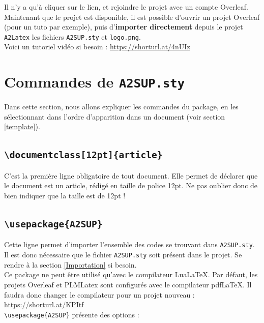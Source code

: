 \documentclass[a4paper,11pt]{article}
\begin{document}
Il n'y a qu'à cliquer sur le lien, et rejoindre le projet avec un compte Overleaf.\\

Maintenant que le projet est disponible, il est possible d'ouvrir un projet Overleaf (pour un tuto par exemple), puis d'\textbf{importer directement} depuis le projet \texttt{A2Latex} les fichiers \texttt{A2SUP.sty} et \texttt{logo.png}.\\

Voici un tutoriel vidéo si besoin : \url{https://shorturl.at/4nUIz}


\section{Commandes de \texttt{A2SUP.sty}}

Dans cette section, nous allons expliquer les commandes du package, en les sélectionnant dans l'ordre d'apparition dans un document (voir section \ref{template}).

\subsection{\texttt{\textbackslash documentclass[12pt]\{article\}}}

C'est la première ligne obligatoire de tout document. Elle permet de déclarer que le document est un article, rédigé en taille de police 12pt. Ne pas oublier donc de bien indiquer que la taille est de 12pt !

\subsection{\texttt{\textbackslash usepackage\{A2SUP\}}}

Cette ligne permet d'importer l'ensemble des codes se trouvant dans \texttt{A2SUP.sty}. Il est donc nécessaire que le fichier \texttt{A2SUP.sty} soit présent dans le projet. Se rendre à la section \ref{Importation} si besoin.\\

Ce package ne peut être utilisé qu'avec le compilateur Lua\LaTeX{}. Par défaut, les projets Overleaf et PLMLatex sont configurés avec le compilateur pdfLaTeX. Il faudra donc changer le compilateur pour un projet nouveau : \url{https://shorturl.at/KPItf}\\


\verb|\usepackage{A2SUP}| présente des options :
\end{document}
